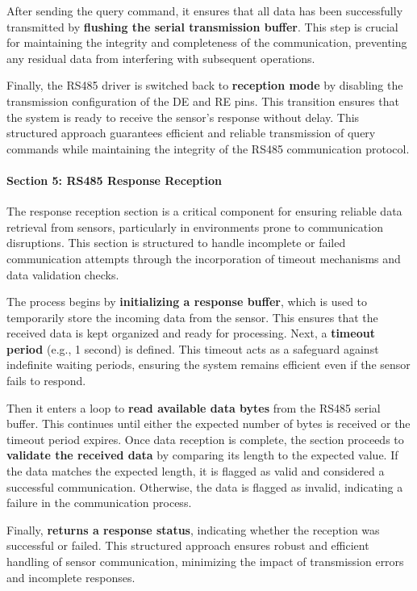 \documentclass{book} %
\begin{document}
\noindent After sending the query command, it ensures that all data has been successfully transmitted by \textbf{flushing the serial transmission buffer}. This step is crucial for maintaining the integrity and completeness of the communication, preventing any residual data from interfering with subsequent operations.

\noindent Finally, the RS485 driver is switched back to \textbf{reception mode} by disabling the transmission configuration of the DE and RE pins. This transition ensures that the system is ready to receive the sensor's response without delay. This structured approach guarantees efficient and reliable transmission of query commands while maintaining the integrity of the RS485 communication protocol.

\noindent 

\noindent 
\paragraph{Section 5: RS485 Response Reception}

\noindent The response reception section is a critical component for ensuring reliable data retrieval from sensors, particularly in environments prone to communication disruptions. This section is structured to handle incomplete or failed communication attempts through the incorporation of timeout mechanisms and data validation checks.

\noindent The process begins by \textbf{initializing a response buffer}, which is used to temporarily store the incoming data from the sensor. This ensures that the received data is kept organized and ready for processing. Next, a \textbf{timeout period} (e.g., 1 second) is defined. This timeout acts as a safeguard against indefinite waiting periods, ensuring the system remains efficient even if the sensor fails to respond.

\noindent Then it enters a loop to \textbf{read available data bytes} from the RS485 serial buffer. This continues until either the expected number of bytes is received or the timeout period expires. Once data reception is complete, the section proceeds to \textbf{validate the received data} by comparing its length to the expected value. If the data matches the expected length, it is flagged as valid and considered a successful communication. Otherwise, the data is flagged as invalid, indicating a failure in the communication process.

\noindent Finally, \textbf{returns a response status}, indicating whether the reception was successful or failed. This structured approach ensures robust and efficient handling of sensor communication, minimizing the impact of transmission errors and incomplete responses.
\end{document}
